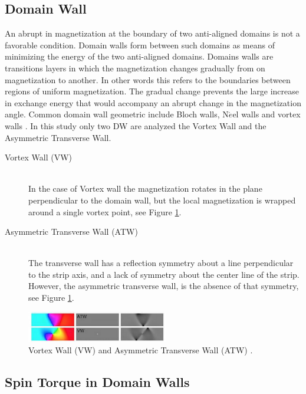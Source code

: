 \subsection{Domain Wall}

An abrupt in magnetization at the boundary of two anti-aligned domains is not a favorable condition. Domain walls form between such domains as means of minimizing the energy of the two anti-aligned domains. Domains walls are transitions layers in which the magnetization changes gradually from on magnetization to another. In other words this refers to the boundaries between regions of uniform magnetization. The gradual change prevents the large increase in exchange energy that would accompany an abrupt change in the magnetization angle. Common domain wall geometric include Bloch walls, N$\acute{e}$el walls and vortex walls \cite{spindomain}. In this study only two DW are analyzed the Vortex Wall and the Asymmetric Transverse Wall.

\begin{description}
  \item[Vortex Wall (VW)] \hfill \\
   In the case of Vortex wall the magnetization rotates in the plane perpendicular to the domain wall, but the local magnetization is wrapped around a single vortex point, see Figure \ref{fig:dw}.
   
 \item[Asymmetric Transverse Wall (ATW)] \hfill \\
 The transverse wall has a reflection symmetry about a line perpendicular to the strip axis, and a lack of symmetry about the center line of the strip. However, the asymmetric transverse wall, is the absence of that symmetry, see Figure \ref{fig:dw}.
 
\end{description}

\begin{figure}[htbp]
	\centering
		\includegraphics[width=0.55\textwidth]{Figures/dw.png}
		\smallskip
	\caption[Domain wall VW and ATW]{Vortex Wall (VW) and Asymmetric Transverse Wall (ATW) \cite{claudio}.}
	\label{fig:dw}
\end{figure}

\subsection{Spin Torque in Domain Walls}

